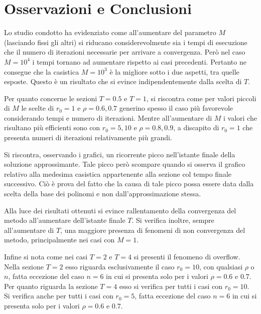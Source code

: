 \documentclass[a4paper,11pt,openright]{report}
\begin{document}
\section{Osservazioni e Conclusioni}
Lo studio condotto ha evidenziato come all'aumentare del parametro $M$ (lasciando fissi gli altri) si riducano considerevolmente sia i tempi di esecuzione che il numero di iterazioni necessarie per arrivare a convergenza. Però nel caso $M = 10^4$ i tempi tornano ad aumentare rispetto ai casi precedenti. Pertanto ne consegue che la casistica $M=10^3$ è la migliore sotto i due aspetti, tra quelle esposte. Questo è un risultato che si evince indipendentemente dalla scelta di $T$.

Per quanto concerne le sezioni $T = 0.5$ e $T =1$, si riscontra come per valori piccoli di $M$ le scelte di $r_0 = 1$ e $\rho = 0.6, 0.7$ generino spesso il caso più favorevole considerando tempi e numero di iterazioni. Mentre all'aumentare di $M$ i valori che risultano più efficienti sono con $r_0=5, 10$ e $\rho = 0.8, 0.9$, a discapito di $r_0=1$ che presenta numeri di iterazioni relativamente più grandi.

Si riscontra, osservando i grafici, un ricorrente picco nell'istante finale della soluzione approssimante. Tale picco però scompare quando si osserva il grafico relativo alla medesima casistica appartenente alla sezione col tempo finale successivo. Ciò è prova del fatto che la causa di tale picco possa essere data dalla scelta della base dei polinomi e non dall'approssimazione stessa.

Alla luce dei risultati ottenuti si evince rallentamento della convergenza del metodo all'aumentare dell'istante finale $T$. Si verifica inoltre, sempre all'aumentare di $T$, una maggiore presenza di fenomeni di non convergenza del metodo, principalmente nei casi con $M=1$. 

Infine si nota come nei casi $T = 2$ e $T = 4$ si presenti il fenomeno di overflow. Nella sezione $T = 2$ esso riguarda esclusivamente il caso $r_0 = 10$, con qualsiasi $\rho$ o $n$, fatta eccezione del caso $n = 6$ in cui si presenta solo per i valori $\rho = 0.6 $ e $0.7$. Per quanto riguarda la sezione $T = 4$ esso si verifica per tutti i casi con $r_0 = 10$. Si verifica anche per tutti i casi con $r_0 = 5$, fatta eccezione del caso $n = 6$ in cui si presenta solo per i valori $\rho = 0.6 $ e $0.7$.
\end{document}
